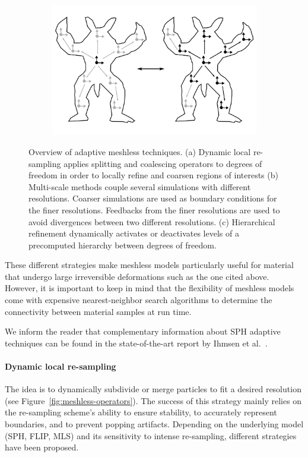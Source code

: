\begin{figure}[t]
\begin{subfigure}[b]{0.3\linewidth}
		\includegraphics[width=\linewidth]{images/starAdaptivity-cgf2016/particles-hierarchy.png}
		\caption{\label{fig:meshless-hierarchy}}
	\end{subfigure}
	\caption[STAR adaptivity: Meshless techniques]{\label{fig:particleOverview}
		Overview of adaptive meshless techniques.
		(a) Dynamic local re-sampling applies splitting and coalescing operators to degrees of freedom in order to locally refine and coarsen regions of interests (b) Multi-scale methods couple several simulations with different resolutions. Coarser simulations are used as boundary conditions for the finer resolutions. Feedbacks from the finer resolutions are used to avoid divergences between two different resolutions. (c) Hierarchical refinement dynamically activates or deactivates levels of a precomputed hierarchy between degrees of freedom.}
\end{figure}

These different strategies make meshless models particularly useful for material that undergo large irreversible deformations such as the one cited above. However, it is important to keep in mind that the flexibility of meshless models come with expensive nearest-neighbor search algorithms to determine the connectivity between material samples at run time.

We inform the reader that complementary information about SPH adaptive techniques can be found in the state-of-the-art report by Ihmsen et al.~\cite{Ihmsen2014:STAR}.

\paragraph*{Dynamic local re-sampling} The idea is to dynamically subdivide or merge particles to fit a desired resolution (see Figure~\ref{fig:meshless-operators}). The success of this strategy mainly relies on the re-sampling scheme's ability to ensure stability, to accurately represent boundaries, and to prevent popping artifacts. Depending on the underlying model (SPH, FLIP, MLS) and its sensitivity to intense re-sampling, different strategies have been proposed.
